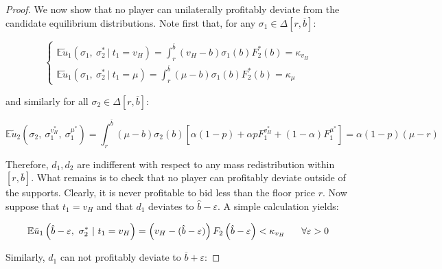 \documentclass[11pt]{article}
\theoremstyle{plain}
\theoremstyle{definition}
\theoremstyle{plain}
\theoremstyle{plain}
\theoremstyle{plain}
\theoremstyle{plain}
\numberwithin{equation}{section}
\begin{document}
\begin{proof}
\noindent We now show that no player can unilaterally profitably deviate from the candidate equilibrium distributions. Note first that, for any $ \sigma_1 \in \Delta[r, \overline{b}] $:

\begin{equation*}
 \begin{cases}
   \mathbb{E} \tilde{u}_1 \left( \sigma_1,\ \sigma_2^* \ | \ t_1 = v_H \right) = \int_{r}^{\overline{b}} (v_H - b) \sigma_1(b) F_2^*(b) = \kappa_{v_H} \\[5pt]
   \mathbb{E} \tilde{u}_1 \left( \sigma_1,\ \sigma_2^* \ | \ t_1 = \mu \right) = \int_{r}^{\overline{b}} (\mu - b) \sigma_1(b) F_2^*(b) = \kappa_{\mu}
 \end{cases}
\end{equation*}

\vspace{0.4cm}

\noindent and similarly for all $ \sigma_2 \in \Delta[r, \overline{b}] $:

\begin{equation*}
\mathbb{E} \tilde{u}_2 \left( \sigma_2,\ \sigma_1^{v_H^*},\ \sigma_1^{\mu^*} \right) = \int_{r}^{\overline{b}} (\mu - b) \sigma_2(b) \left[ \alpha (1 - p) + \alpha p F_1^{v_H^*} + (1 - \alpha) F_1^{\mu^*} \right] = \alpha (1 - p)(\mu - r)   
\end{equation*}

\vspace{0.4cm}

\noindent Therefore, $ d_1, d_2 $ are indifferent with respect to any mass redistribution within $ \left[ r, \overline{b} \right] $. What remains is to check that no player can profitably deviate outside of the supports. Clearly, it is never profitable to bid less than the floor price $ r $. Now suppose that $ t_1 = v_H $ and that $ d_1 $ deviates to $ \hat{b}-\varepsilon $. A simple calculation yields:

\begin{equation*}
 \mathbb{E} \tilde{u}_1 \left( \hat{b}-\varepsilon,\ \sigma_2^* \ | \ t_1 = v_H \right) = \left(v_H - (\hat{b} - \varepsilon) \right) F_2 \left( \hat{b} - \varepsilon \right) < \kappa_{v_H} \hspace{0.6cm} \forall \varepsilon > 0
\end{equation*}

\vspace{4mm}

\noindent Similarly, $ d_1 $ can not profitably deviate to $ \overline{b} + \varepsilon $:


\end{proof}
\end{document}
